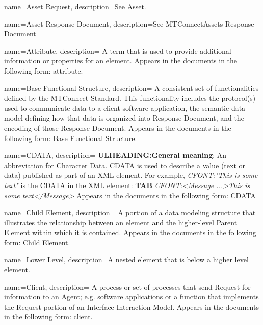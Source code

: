 {
    name={Asset Request},
	description={See \gls{Asset}.}
}

{
    name={Asset Response Document},
	description={See \gls{MTConnectAssets Response Document}}
}

{
    name={Attribute},
	description={
  A term that is used to provide additional information or properties for an element.
  Appears in the documents in the following form: attribute.
}
}

{
    name={Base Functional Structure},
	description={
  A consistent set of functionalities defined by the MTConnect Standard. This functionality includes the protocol(s) used to communicate data to a client software application, the \gls{semantic data model} defining how that data is organized into \gls{Response Document}, and the encoding of those \gls{Response Document}.
  Appears in the documents in the following form: \gls{Base Functional Structure}.
}
}

{
    name={CDATA},
	description={
  \textbf{ULHEADING:General meaning}:
  An abbreviation for Character Data.
  \gls{CDATA} is used to describe a value (text or data) published as part of an XML element.
  For example, \textit{CFONT:"This is some text"} is the \gls{CDATA} in the XML element:
  \textbf{TAB} \textit{CFONT:<Message ...>This is some text</Message>}
  Appears in the documents in the following form: \gls{CDATA}
}
}

{
    name={Child Element},
	description={
  A portion of a data modeling structure that illustrates the relationship between an element and the higher-level \gls{Parent Element} within which it is contained.
  Appears in the documents in the following form: \gls{Child Element}.
}
}

{
    name={Lower Level},
	description={A nested element that is below a higher level element.}
}

{
    name={Client},
	description={
  A process or set of processes that send \gls{Request} for information to an \gls{Agent}; e.g. software applications or a function that implements the \gls{Request} portion of an \gls{Interface} \gls{Interaction Model}.
  Appears in the documents in the following form: client.
}
}

